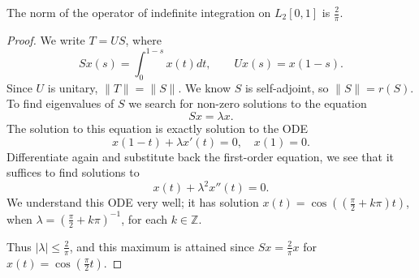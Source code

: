 \begin{proposition}
	\label{prop:NormIndefInt}
	The norm of the operator of indefinite integration on $L_2[0,1]$ is $\frac{2}{\pi}$.
\end{proposition}
\begin{proof}
	We write $T = U S$, where
	\[
		S x(s) = \int _0^{1 - s} x(t) d t , \qquad
		U x(s) = x(1 - s)
	.\] 
	Since $U$ is unitary, $\|T\| = \|S\|$. We know $S$ is self-adjoint, so $\|S\| = r(S)$. To find eigenvalues of $S$ we search for non-zero solutions to the equation
	\[
		S x = \lambda x
	.\] 
	The solution to this equation is exactly solution to the ODE
	\[
		x(1 - t) + \lambda x'(t) = 0, \quad x(1) = 0
	.\] 
	Differentiate again and substitute back the first-order equation, we see that it suffices to find solutions to
	\[
		x(t) + \lambda^2 x''(t) = 0
	.\] 
	We understand this ODE very well; it has solution $x(t) = \cos \left( \left( \frac{\pi}{2} + k \pi \right) t \right)$, when $\lambda = \left( \frac{\pi}{2} + k \pi \right) ^{-1}$, for each $k \in \mathbb{Z}$.
	
	Thus $|\lambda| \le \frac{2}{\pi}$, and this maximum is attained since $S x = \frac{2}{\pi} x$ for $x(t) = \cos \left( \frac{\pi}{2} t \right) $.

\end{proof}

